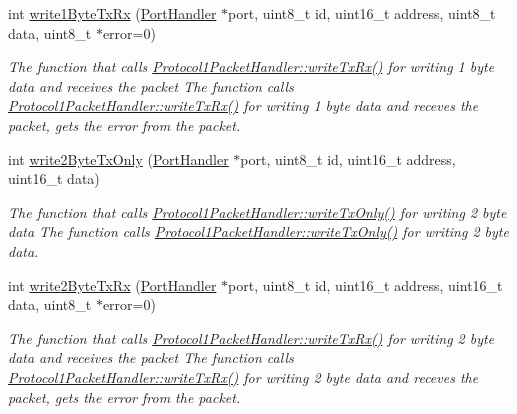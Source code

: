 \begin{DoxyCompactItemize}
int \hyperlink{classmercury_1_1_protocol1_packet_handler_a1ab39b54232f07c37e1d11e8173d2896}{write1\+Byte\+Tx\+Rx} (\hyperlink{classmercury_1_1_port_handler}{Port\+Handler} $\ast$port, uint8\+\_\+t id, uint16\+\_\+t address, uint8\+\_\+t data, uint8\+\_\+t $\ast$error=0)
\begin{DoxyCompactList}\small\item\em The function that calls \hyperlink{classmercury_1_1_protocol1_packet_handler_abbeadd6883c895cb8f9f9497c27d8a94}{Protocol1\+Packet\+Handler\+::write\+Tx\+Rx()} for writing 1 byte data and receives the packet  The function calls \hyperlink{classmercury_1_1_protocol1_packet_handler_abbeadd6883c895cb8f9f9497c27d8a94}{Protocol1\+Packet\+Handler\+::write\+Tx\+Rx()} for writing 1 byte data and receves the packet,  gets the error from the packet. \end{DoxyCompactList}\item 
int \hyperlink{classmercury_1_1_protocol1_packet_handler_ae854301415b739c6c474ac1efb9b94a6}{write2\+Byte\+Tx\+Only} (\hyperlink{classmercury_1_1_port_handler}{Port\+Handler} $\ast$port, uint8\+\_\+t id, uint16\+\_\+t address, uint16\+\_\+t data)
\begin{DoxyCompactList}\small\item\em The function that calls \hyperlink{classmercury_1_1_protocol1_packet_handler_a4dac18c7624bef8723b1e96889bce665}{Protocol1\+Packet\+Handler\+::write\+Tx\+Only()} for writing 2 byte data  The function calls \hyperlink{classmercury_1_1_protocol1_packet_handler_a4dac18c7624bef8723b1e96889bce665}{Protocol1\+Packet\+Handler\+::write\+Tx\+Only()} for writing 2 byte data. \end{DoxyCompactList}\item 
int \hyperlink{classmercury_1_1_protocol1_packet_handler_a2c353dbf943029fa3d046dc8521190f2}{write2\+Byte\+Tx\+Rx} (\hyperlink{classmercury_1_1_port_handler}{Port\+Handler} $\ast$port, uint8\+\_\+t id, uint16\+\_\+t address, uint16\+\_\+t data, uint8\+\_\+t $\ast$error=0)
\begin{DoxyCompactList}\small\item\em The function that calls \hyperlink{classmercury_1_1_protocol1_packet_handler_abbeadd6883c895cb8f9f9497c27d8a94}{Protocol1\+Packet\+Handler\+::write\+Tx\+Rx()} for writing 2 byte data and receives the packet  The function calls \hyperlink{classmercury_1_1_protocol1_packet_handler_abbeadd6883c895cb8f9f9497c27d8a94}{Protocol1\+Packet\+Handler\+::write\+Tx\+Rx()} for writing 2 byte data and receves the packet,  gets the error from the packet. \end{DoxyCompactList}\item 

\end{DoxyCompactItemize}
